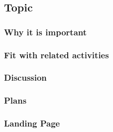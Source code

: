 \subsection{Topic}

\subsubsection{Why it is important}

\subsubsection{Fit with related activities}

\subsubsection{Discussion}

\subsubsection{Plans}

\subsubsection{Landing Page}
